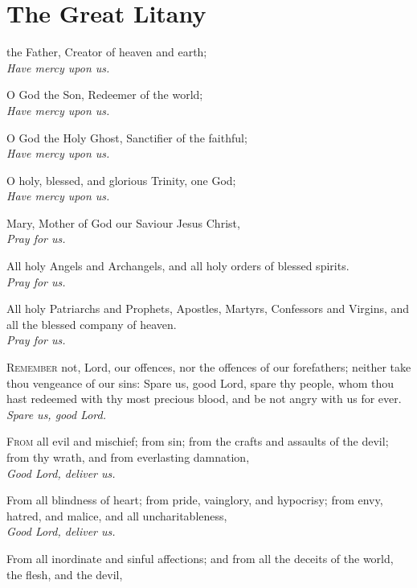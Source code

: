 \section{The Great Litany}
 the Father, Creator of heaven and earth;\\
  \textit{Have mercy upon us.}
  \par
O God the Son, Redeemer of the world;\\
  \textit{Have mercy upon us.}
  \par
O God the Holy Ghost, Sanctifier of the faithful;\\
  \textit{Have mercy upon us.}
  \par
O holy, blessed, and glorious Trinity, one God;\\
  \textit{Have mercy upon us.}\\
  \par\noindent
   Mary, Mother of God our Saviour Jesus Christ,\\
  \textit{Pray for us.}
  \par
  All holy Angels and Archangels, and all holy orders of blessed spirits.\\
  \textit{Pray for us.}\par
  All holy Patriarchs and Prophets, Apostles, Martyrs, Confessors and Virgins, and all the blessed company of heaven.\\
  \textit{Pray for us.}\par
\textsc{Remember} not, Lord, our offences, nor the offences of our forefathers; neither take thou vengeance of our sins: Spare us, good Lord, spare thy people, whom thou hast redeemed with thy most precious blood, and be not angry with us for ever.\\
    \textit{Spare us, good Lord.}\\
\par
\textsc{From} all evil and mischief; from sin; from the crafts and assaults of the devil; from thy wrath, and from everlasting damnation,\\
    \textit{Good Lord, deliver us.}
    \par
    From all blindness of heart; from pride, vainglory, and hypocrisy; from envy, hatred, and malice, and all uncharitableness,\\
    \textit{Good Lord, deliver us.}
    \par
    From all inordinate and sinful affections; and from all the deceits of the world, the flesh, and the devil,\\
